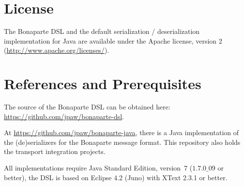 \documentclass[11pt,a4paper,oneside]{article}
\begin{document}
\section{License}
The Bonaparte DSL and the default serialization / deserialization implementation for Java
are available under the Apache license, version 2 (\url{http://www.apache.org/licenses/}). 

\section{References and Prerequisites}
The source of the Bonaparte DSL can be obtained here: \url{https://github.com/jpaw/bonaparte-dsl}.

At \url{https://github.com/jpaw/bonaparte-java}, there is a Java implementation of the (de)serializers for the Bonaparte message format. This repository also holds the transport integration projects.

All implementations require Java Standard Edition, version~7 ($1.7.0\_09$ or better), the DSL is based on Eclipse 4.2 (Juno) with XText 2.3.1 or better. 
\end{document}
